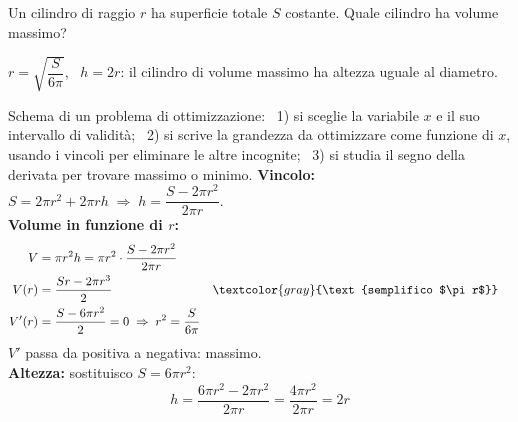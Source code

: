 \begin{question}[ID=2.1, subtitle={Cilindro di massimo volume con superficie totale fissa}, tags={ottimizzazione, geometria, solidi}, difficulty=media]
Un cilindro di raggio \(r\) ha superficie totale \(S\) costante. Quale cilindro ha volume massimo?
\begin{solution}
$r=\sqrt{\dfrac{S}{6\pi}}$, \ $h=2r$: il cilindro di volume massimo ha altezza uguale al diametro.
\end{solution}
\begin{explanation}
Schema di un problema di ottimizzazione: \ 1) si sceglie la variabile $x$ e il suo intervallo di validità; \ 2) si scrive la grandezza da ottimizzare come funzione di $x$, usando i vincoli per eliminare le altre incognite; \ 3) si studia il segno della derivata per trovare massimo o minimo.
\textbf{Vincolo:} \ $S=2\pi r^2+2\pi rh \;\Rightarrow\; h=\dfrac{S-2\pi r^2}{2\pi r}$. \\
\textbf{Volume in funzione di $r$:}
\[\begin{aligned}
V &= \pi r^2h=\pi r^2\cdot\dfrac{S-2\pi r^2}{2\pi r}\\
V(r) &= \dfrac{Sr-2\pi r^3}{2} && \textcolor{gray}{\text{semplifico $\pi r$}}\\
V'(r) &= \dfrac{S-6\pi r^2}{2}=0 \;\Rightarrow\; r^2=\dfrac{S}{6\pi}
\end{aligned}\]
$V'$ passa da positiva a negativa: massimo. \\
\textbf{Altezza:} sostituisco $S=6\pi r^2$:
\[ h=\dfrac{6\pi r^2-2\pi r^2}{2\pi r}=\dfrac{4\pi r^2}{2\pi r}=2r \]
\end{explanation}
\end{question}


